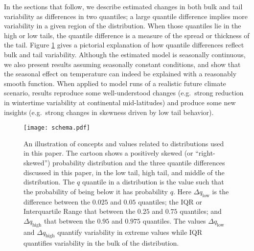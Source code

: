 \documentclass{ametsoc}
\newcommand\smallfigwidth{\columnwidth}
\begin{document}
 In the sections that follow, we describe estimated changes in both bulk and tail variability as differences in two quantiles; a large quantile difference implies more variability in a given region of the distribution. 
When those quantiles lie in the high or low tails, the quantile difference is a measure of the spread or thickness of the tail.
 Figure \ref{schema} gives a pictorial explanation of how quantile differences reflect bulk and tail variability.
Although the estimated model is seasonally continuous, we also present results assuming seasonally constant conditions, and show that the seasonal effect on temperature can indeed be explained with a reasonably smooth function. When applied to model runs of a realistic future climate scenario, results reproduce some well-understood changes (e.g.\ strong reduction in wintertime variability at continental mid-latitudes) and produce some new insights (e.g.\ strong changes in skewness driven by low tail behavior). 


\begin{figure} 
\texttt{[image: schema.pdf]}
\caption{\small{An illustration of concepts and values related to distributions used in this paper. The cartoon shows a positively skewed (or ``right-skewed'') probability distribution and the three quantile differences discussed in this paper, in the low tail, high tail, and middle of the distribution. 
The $q$ quantile in a distribution is the value such that the probability of being below it has probability $q$. Here $\Delta q_{\text{low}}$ is the difference between the $0.025$ and $0.05$ quantiles; the IQR or Interquartile Range that between the $0.25$ and $0.75$ quantiles; and $\Delta q_{\text{high}}$ that between the $0.95$ and $0.975$ quantiles. The values $\Delta q_{\text{low}}$ and $\Delta q_\text{high}$ quantify variability in extreme values while IQR quantifies variability in the bulk of the distribution.
}}            %
\label{schema}          %
\end{figure}

\end{document}
